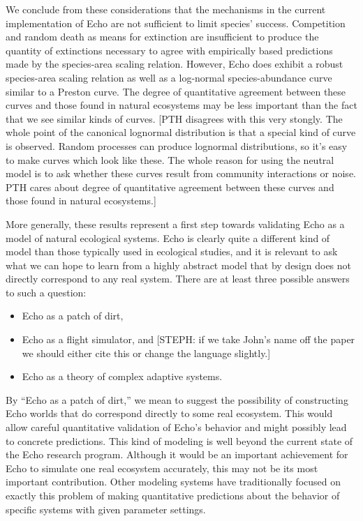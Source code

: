 We conclude from these considerations that the mechanisms in the
current implementation of Echo are not sufficient to limit species'
success.  Competition and random death as means for extinction are
insufficient to produce the quantity of extinctions necessary to agree
with empirically based predictions made by the species-area scaling
relation.  However, Echo does exhibit a robust species-area scaling
relation as well as a log-normal species-abundance curve similar to a
Preston curve.  The degree of quantitative agreement between these
curves and those found in natural ecosystems may be less important
than the fact that we see similar kinds of curves.
[PTH disagrees with this very stongly.  The whole point of the canonical
lognormal distribution is that a special kind of curve is observed.
Random processes can produce lognormal distributions, so it's easy to 
make curves which look like these.  The whole reason for using the neutral 
model is to ask whether these curves result from community interactions or 
noise.  PTH cares about degree of quantitative agreement between these
curves and those found in natural ecosystems.]

More generally, these results represent a first step towards
validating Echo as a model of natural ecological systems.  Echo is
clearly quite a different kind of model than those typically used in
ecological studies, and it is relevant to ask what we can hope to
learn from a highly abstract model that by design does not directly
correspond to any real system.  There are at least three possible
answers to such a question:
\begin{itemize}
\item Echo as a patch of dirt,
\item Echo as a flight simulator, and [STEPH: if we take John's name
off the paper we should either cite this or change the language slightly.]
\item Echo as a theory of complex adaptive systems.
\end{itemize}

By ``Echo as a patch of dirt,'' we mean to suggest the possibility of
constructing Echo worlds that do correspond directly to some real
ecosystem.  This would allow careful quantitative validation of Echo's
behavior and might possibly lead to concrete predictions.  This kind
of modeling is well beyond the current state of the Echo research
program.  Although it would be an important achievement for Echo to
simulate one real ecosystem accurately, this may not be its most
important contribution.  Other modeling systems have traditionally
focused on exactly this problem of making quantitative predictions
about the behavior of specific systems with given parameter settings.

